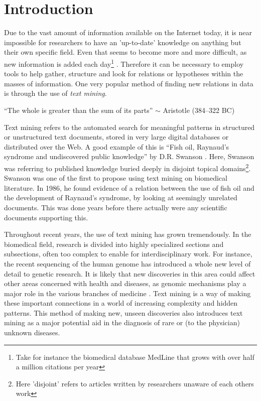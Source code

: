 \chapter{Introduction\label{Introduction}}

Due to the vast amount of information available on the Internet today,
it is near impossible for researchers to have an 'up-to-date'
knowledge on anything but their own specific field. Even that seems
to become more and more difficult, as new information is added each
day\footnote{Take for instance the biomedical database MedLine that
  grows with over half a million citations per year}
\cite{CitAddMedLine}. Therefore it can be necessary to employ tools to
help gather, structure and look for relations or hypotheses within the
masses of information. One very popular method of finding new relations in
data is through the use of \textit{text mining}.

\begin{center}
{\small``The whole is greater than the sum of its parts'' $\sim$ Aristotle
(384--322 BC)} 
\end{center}

Text mining refers to the automated search for meaningful patterns in
structured or unstructured text documents, stored in very large digital
databases or distributed over the Web. A good example of this is
``Fish oil, Raynaud's syndrome and undiscovered public knowledge'' by
D.R. Swanson \cite{DRSwanson}. Here, Swanson was referring to published
knowledge buried deeply in disjoint topical domains\footnote{Here
  'disjoint' refers to articles written by researchers unaware of each
  others work}. Swanson was one of the first to propose using text
mining on biomedical literature. In 1986, he found evidence of a
relation between the use of fish oil and the development of Raynaud's
syndrome, by looking at seemingly unrelated documents. This was done
years before there actually were any scientific documents supporting
this.

Throughout recent years, the use of text mining has grown
tremendously. In the biomedical field, research is divided into highly
specialized sections and subsections, often too complex to enable for
interdisciplinary work. For instance, the recent sequencing of the
human genome has introduced a whole new level of detail to genetic
research. It is likely that new discoveries in this area could affect
other areas concerned with health and diseases, as genomic
mechanisms play a major role in the various branches of medicine
\cite{survey.biomed.text.cohen.2005}. Text mining is a way of making
these important connections in a world of increasing complexity and
hidden patterns. This method of making new, unseen discoveries also
introduces text mining as a major potential aid in the diagnosis of
rare or (to the physician) unknown diseases.

